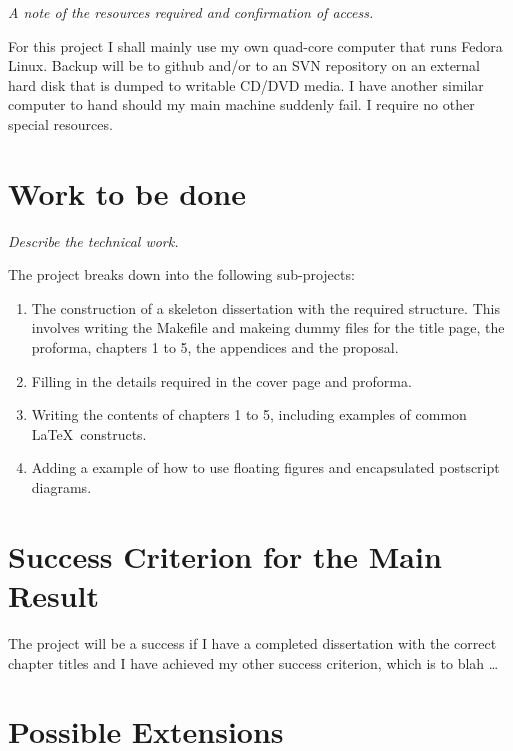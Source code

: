 \documentclass[12pt,a4paper,twoside]{article}
\begin{document}
{\em A note of the resources required and confirmation of access.}

For this project I shall mainly use my own quad-core computer that
runs Fedora Linux. Backup will be to github and/or to an SVN
repository on an external hard disk that is dumped to writable CD/DVD
media. I have another similar computer to hand should my main machine
suddenly fail. I require no other special resources.

\section*{Work to be done}

{\em Describe the technical work.}

The project breaks down into the following sub-projects:

\begin{enumerate}

\item The construction of a skeleton dissertation with the required
  structure. This involves writing the Makefile and makeing dummy
  files for the title page, the proforma, chapters 1 to 5, the
  appendices and the proposal.

\item Filling in the details required in the cover page and proforma.

\item Writing the contents of chapters 1 to 5, including examples of
  common \LaTeX\ constructs.

\item Adding a example of how to use floating figures and encapsulated
  postscript diagrams.

\end{enumerate}

\section*{Success Criterion for the Main Result}


The project will be a success if I have a completed dissertation with
the correct chapter titles and I have achieved my other success
criterion, which is to blah \ldots



\section*{Possible Extensions}
\end{document}
